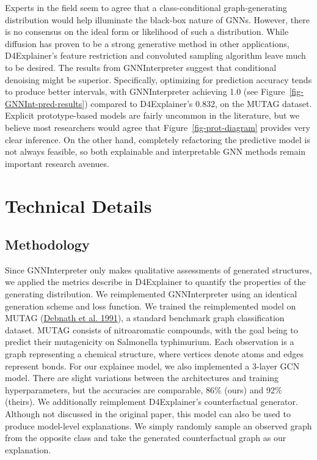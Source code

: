\documentclass[
  11pt,
  letterpaper,
]{article}
\begin{document}
\quad Experts in the field seem to agree that a class-conditional
graph-generating distribution would help illuminate the black-box nature
of GNNs. However, there is no consensus on the ideal form or likelihood
of such a distribution. While diffusion has proven to be a strong
generative method in other applications, D4Explainer's feature
restriction and convoluted sampling algorithm leave much to be desired.
The results from GNNInterpreter suggest that conditional denoising might
be superior. Specifically, optimizing for prediction accuracy tends to
produce better intervals, with GNNInterpreter achieving 1.0 (see
Figure~\ref{fig-GNNInt-pred-results}) compared to D4Explainer's 0.832,
on the MUTAG dataset. Explicit prototype-based models are fairly
uncommon in the literature, but we believe most researchers would agree
that Figure~\ref{fig-prot-diagram} provides very clear inference. On the
other hand, completely refactoring the predictive model is not always
feasible, so both explainable and interpretable GNN methods remain
important research avenues.

\hypertarget{technical-details}{%
\section{Technical Details}\label{technical-details}}

\hypertarget{methodology}{%
\subsection{Methodology}\label{methodology}}

\quad Since GNNInterpreter only makes qualitative assessments of
generated structures, we applied the metrics describe in D4Explainer to
quantify the properties of the generating distribution. We reimplemented
GNNInterpreter using an identical generation scheme and loss function.
We trained the reimplemented model on MUTAG
(\protect\hyperlink{ref-Debnath_1991}{Debnath et al. 1991}), a standard
benchmark graph classification dataset. MUTAG consists of nitroaromatic
compounds, with the goal being to predict their mutagenicity on
Salmonella typhimurium. Each observation is a graph representing a
chemical structure, where vertices denote atoms and edges represent
bonds. For our explainee model, we also implemented a 3-layer GCN model.
There are slight variations between the architectures and training
hyperparameters, but the accuracies are comparable, 86\% (ours) and 92\%
(theirs). We additionally reimplement D4Explainer's counterfactual
generator. Although not discussed in the original paper, this model can
also be used to produce model-level explanations. We simply randomly
sample an observed graph from the opposite class and take the generated
counterfactual graph as our explanation.
\end{document}
